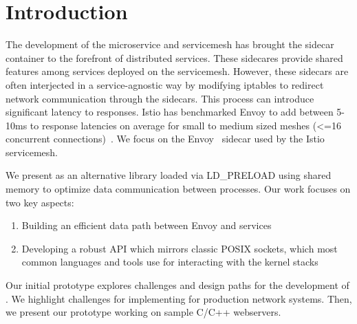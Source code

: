 \section{Introduction}
\label{sec:introduction}
The development of the microservice and servicemesh has brought the sidecar container to the forefront of distributed services.
These sidecares provide shared features among services deployed on the servicemesh.
However, these sidecars are often interjected in a service-agnostic way by modifying iptables to redirect network communication through the sidecars.
This process can introduce significant latency to responses.
Istio has benchmarked Envoy to add between 5-10ms to response latencies on average for small to medium sized meshes (<=16 concurrent connections)~\cite{envoy_perf}.
We focus on the Envoy~\cite{envoy} sidecar used by the Istio~\cite{istio} servicemesh.

We present \sysname as an alternative library loaded via LD\_PRELOAD using shared memory to optimize data communication between processes.
Our work focuses on two key aspects:
\begin{enumerate}
    \item Building an efficient data path between Envoy and services
    \item Developing a robust API which mirrors classic POSIX sockets, which most common languages and tools use for interacting with the kernel stacks
\end{enumerate}

Our initial prototype explores challenges and design paths for the development of \sysname.
We highlight challenges for implementing \sysname for production network systems.
Then, we present our prototype working on sample C/C++ webservers.